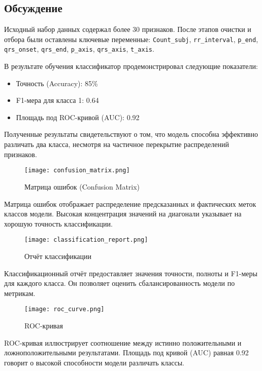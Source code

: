 \documentclass{article}
\providecommand{\pcsync}{\par\vspace{\baselineskip}}
\begin{document}
\begin{paracol}{2}
\switchcolumn*

\section{Обсуждение}
\pcsync
Исходный набор данных содержал более 30 признаков. После этапов очистки и отбора были оставлены ключевые переменные: \texttt{Count\_subj}, \texttt{rr\_interval}, \texttt{p\_end}, \texttt{qrs\_onset}, \texttt{qrs\_end}, \texttt{p\_axis}, \texttt{qrs\_axis}, \texttt{t\_axis}. 

В результате обучения классификатор продемонстрировал следующие показатели:

\begin{itemize}
\item Точность (Accuracy): 85\%
\item F1-мера для класса 1: 0.64
\item Площадь под ROC-кривой (AUC): 0.92
\end{itemize}

Полученные результаты свидетельствуют о том, что модель способна эффективно различать два класса, несмотря на частичное перекрытие распределений признаков.


\begin{figure}[H]
    \centering
    \texttt{[image: confusion\_matrix.png]}
    \caption{Матрица ошибок (Confusion Matrix)}
    \label{fig:enter-label}
\end{figure}

Матрица ошибок отображает распределение предсказанных и фактических меток классов модели. Высокая концентрация значений на диагонали указывает на хорошую точность классификации.

\begin{figure}[H]
\centering
\texttt{[image: classification\_report.png]}
\caption{Отчёт классификации}
\end{figure}

Классификационный отчёт предоставляет значения точности, полноты и F1-меры для каждого класса. Он позволяет оценить сбалансированность модели по метрикам.

\begin{figure}[H]
\centering
\texttt{[image: roc\_curve.png]}
\caption{ROC-кривая}
\end{figure}

ROC-кривая иллюстрирует соотношение между истинно положительными и ложноположительными результатами. Площадь под кривой (AUC) равная 0.92 говорит о высокой способности модели различать классы.


\end{paracol}
\end{document}
